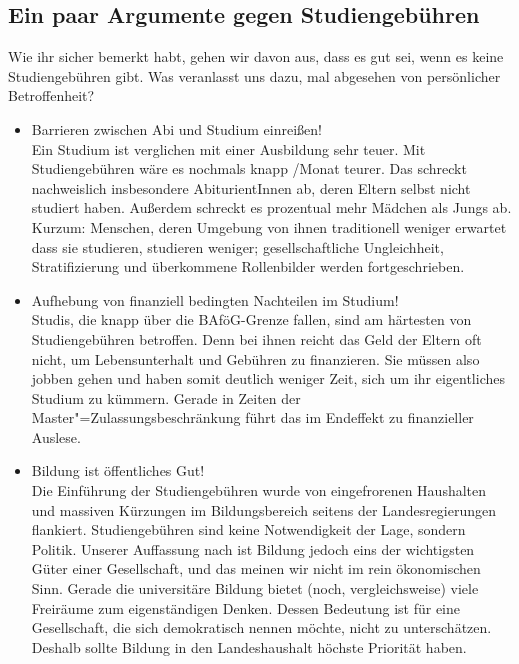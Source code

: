 \subsection*{Ein paar Argumente gegen Studiengebühren}

Wie ihr sicher bemerkt habt, gehen wir davon aus, dass es gut sei, wenn es keine Studiengebühren gibt. Was veranlasst uns dazu, mal abgesehen von persönlicher Betroffenheit?
\begin{itemize}
\item {Barrieren zwischen Abi und Studium einreißen!}\\
	Ein Studium ist verglichen mit einer Ausbildung sehr teuer. Mit Studiengebühren wäre es nochmals knapp /Monat teurer. Das schreckt nachweislich insbesondere AbiturientInnen ab, deren Eltern selbst nicht studiert haben. Außerdem schreckt es prozentual mehr Mädchen als Jungs ab. Kurzum: Menschen, deren Umgebung von ihnen traditionell weniger erwartet dass sie studieren, studieren weniger; gesellschaftliche Ungleichheit, Stratifizierung und überkommene Rollenbilder werden fortgeschrieben.
\item {Aufhebung von finanziell bedingten Nachteilen im Studium!}\\
	Studis, die knapp über die BAföG-Grenze fallen, sind am härtesten von Studiengebühren betroffen. Denn bei ihnen reicht das Geld der Eltern oft nicht, um Lebensunterhalt und Gebühren zu finanzieren. Sie müssen also jobben gehen und haben somit deutlich weniger Zeit, sich um ihr eigentliches Studium zu kümmern. Gerade in Zeiten der Master"=Zulassungsbeschränkung führt das im Endeffekt zu finanzieller Auslese.
\item {Bildung ist öffentliches Gut!}\\
	Die Einführung der Studiengebühren wurde von eingefrorenen Haushalten und massiven Kürzungen im Bildungsbereich seitens der Landesregierungen flankiert. Studiengebühren sind keine Notwendigkeit der Lage, sondern Politik. Unserer Auffassung nach ist Bildung jedoch eins der wichtigsten Güter einer Gesellschaft, und das meinen wir nicht im rein ökonomischen Sinn. Gerade die universitäre Bildung bietet (noch, vergleichsweise) viele Freiräume zum eigenständigen Denken. Dessen Bedeutung ist für eine Gesellschaft, die sich demokratisch nennen möchte, nicht zu unterschätzen. Deshalb sollte Bildung in den Landeshaushalt höchste Priorität haben.
\end{itemize}

